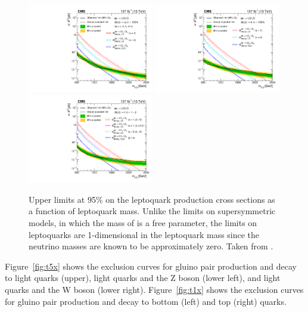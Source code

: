 \begin{figure}[htbp]
 \centering
   \includegraphics[width=0.49\textwidth]{figures/MT2_2019/Figure_016-a}
   \includegraphics[width=0.49\textwidth]{figures/MT2_2019/Figure_016-b}
   \includegraphics[width=0.49\textwidth]{figures/MT2_2019/Figure_016-c}
   \caption[Upper limits at 95\% \CL on the leptoquark production cross sections as a function of leptoquark mass.]{
     Upper limits at 95\% \CL on the leptoquark production cross sections as a function of leptoquark mass. 
     Unlike the limits on supersymmetric models, in which the mass of \lsp is a free parameter, the limits on leptoquarks are 1-dimensional in the leptoquark mass since the neutrino masses are known to be approximately zero.
     Taken from \cite{MT2_2019}.}
   \label{fig:lqlimit}
\end{figure}

  Figure~\ref{fig:t5x} shows the exclusion curves for gluino pair production and decay to light quarks (upper), light quarks and the Z boson (lower left), and light quarks and the W boson (lower right).
  Figure~\ref{fig:t1x} shows the exclusion curves for gluino pair production and decay to bottom (left) and top (right) quarks.

